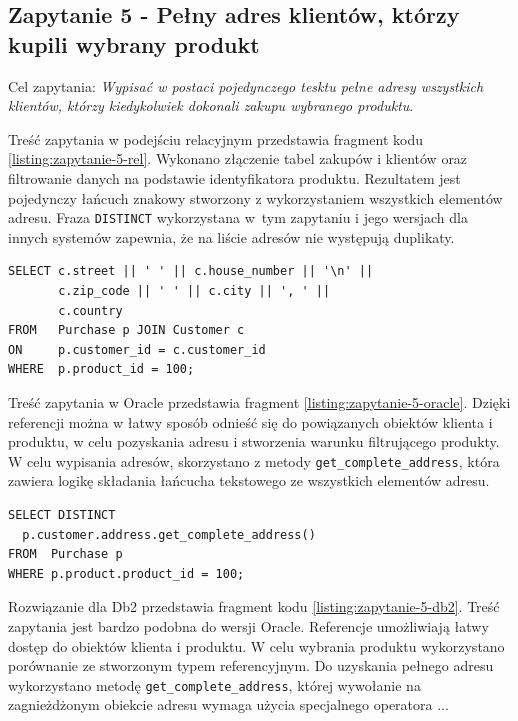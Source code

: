 \documentclass[a4paper,twoside,12pt]{book}
\begin{document}
\subsection{Zapytanie 5 - Pełny adres klientów, którzy kupili wybrany produkt}

Cel zapytania: \textit{Wypisać w postaci pojedynczego tesktu pełne adresy wszystkich klientów, którzy kiedykolwiek dokonali zakupu wybranego produktu}.

Treść zapytania w podejściu relacyjnym przedstawia fragment kodu \ref{listing:zapytanie-5-rel}. Wykonano złączenie tabel zakupów i klientów oraz filtrowanie danych na podstawie identyfikatora produktu. Rezultatem jest pojedynczy łańcuch znakowy stworzony z wykorzystaniem wszystkich elementów adresu. Fraza \lstinline{DISTINCT} wykorzystana w~tym zapytaniu i jego wersjach dla innych systemów zapewnia, że na liście adresów nie występują duplikaty.

\begin{lstlisting}[style=SQL, caption={Zapytanie piąte w podejściu relacyjnym.}, label={listing:zapytanie-5-rel}, captionpos=b]
SELECT c.street || ' ' || c.house_number || '\n' || 
       c.zip_code || ' ' || c.city || ', ' || 
       c.country
FROM   Purchase p JOIN Customer c 
ON     p.customer_id = c.customer_id
WHERE  p.product_id = 100;
\end{lstlisting}

Treść zapytania w Oracle przedstawia fragment \ref{listing:zapytanie-5-oracle}. Dzięki referencji można w łatwy sposób odnieść się do powiązanych obiektów klienta i produktu, w celu pozyskania adresu i stworzenia warunku filtrującego produkty. W celu wypisania adresów, skorzystano z metody \lstinline{get_complete_address}, która zawiera logikę składania łańcucha tekstowego ze wszystkich elementów adresu. 
\begin{lstlisting}[style=SQL, caption={Zapytanie piąte w Oracle.}, label={listing:zapytanie-5-oracle}, captionpos=b]
SELECT DISTINCT 
  p.customer.address.get_complete_address()
FROM  Purchase p
WHERE p.product.product_id = 100;
\end{lstlisting}

Rozwiązanie dla Db2 przedstawia fragment kodu \ref{listing:zapytanie-5-db2}. Treść zapytania jest bardzo podobna do wersji Oracle. Referencje umożliwiają łatwy dostęp do obiektów klienta i produktu. W celu wybrania produktu wykorzystano porównanie ze stworzonym typem referencyjnym. Do uzyskania pełnego adresu wykorzystano metodę \lstinline{get_complete_address}, której wywołanie na zagnieżdżonym obiekcie adresu wymaga użycia specjalnego operatora \textquotedbl..\textquotedbl.
\end{document}
